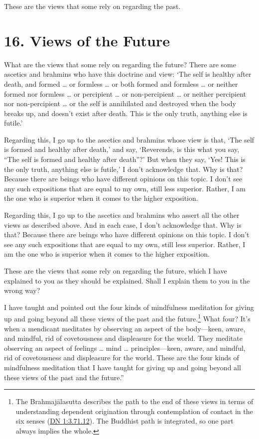 \documentclass[12pt,openany]{book}%
\begin{document}
These are the views that some rely on regarding the past. 

\section*{16. Views of the Future }

What are the views that some rely on regarding the future? There are some ascetics and brahmins who have this doctrine and view: ‘The self is healthy after death, and formed … or formless … or both formed and formless … or neither formed nor formless … or percipient … or non-percipient … or neither percipient nor non-percipient … or the self is annihilated and destroyed when the body breaks up, and doesn’t exist after death. This is the only truth, anything else is futile.’ 

Regarding this, I go up to the ascetics and brahmins whose view is that, ‘The self is formed and healthy after death,’ and say, ‘Reverends, is this what you say, “The self is formed and healthy after death”?’ But when they say, ‘Yes! This is the only truth, anything else is futile,’ I don’t acknowledge that. Why is that? Because there are beings who have different opinions on this topic. I don’t see any such expositions that are equal to my own, still less superior. Rather, I am the one who is superior when it comes to the higher exposition. 

Regarding this, I go up to the ascetics and brahmins who assert all the other views as described above. And in each case, I don’t acknowledge that. Why is that? Because there are beings who have different opinions on this topic. I don’t see any such expositions that are equal to my own, still less superior. Rather, I am the one who is superior when it comes to the higher exposition. 

These are the views that some rely on regarding the future, which I have explained to you as they should be explained. Shall I explain them to you in the wrong way? 

I have taught and pointed out the four kinds of mindfulness meditation for giving up and going beyond all these views of the past and the future.\footnote{The \textsanskrit{Brahmajālasutta} describes the path to the end of these views in terms of understanding dependent origination through contemplation of contact in the six senses (\href{https://suttacentral.net/dn1/en/sujato\#3.71.12}{DN 1:3.71.12}). The Buddhist path is integrated, so one part always implies the whole. } What four? It’s when a mendicant meditates by observing an aspect of the body—keen, aware, and mindful, rid of covetousness and displeasure for the world. They meditate observing an aspect of feelings … mind … principles—keen, aware, and mindful, rid of covetousness and displeasure for the world. These are the four kinds of mindfulness meditation that I have taught for giving up and going beyond all these views of the past and the future.” 
\end{document}
